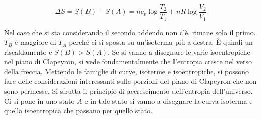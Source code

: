 \[
	\Delta S = S(B)-S(A) = nc_v\log \frac{T_2 }{T_1 } + nR \log \frac{V_2 }{V_1 }
\]

Nel caso che si sta considerando il secondo addendo non c'è, rimane solo il primo. $T_B$ è maggiore di $T_A$ perché ci si sposta su un'isoterma più a destra. È quindi un riscaldamento e $S(B)>S(A)$. Se si vanno a disegnare le varie isoentropiche nel piano di Clapeyron, si vede fondamentalmente che l'entropia cresce nel verso della freccia.
Mettendo le famiglie di curve, isoterme e isoentropiche, si possono fare delle considerazioni interessanti sulle porzioni del piano di Clapeyron che non sono permesse. Si sfrutta il principio di accrescimento dell'entropia dell'universo. Ci si pone in uno stato $A$ e in tale stato si vanno a disegnare la curva isoterma e quella isoentropica che passano per quello stato.

